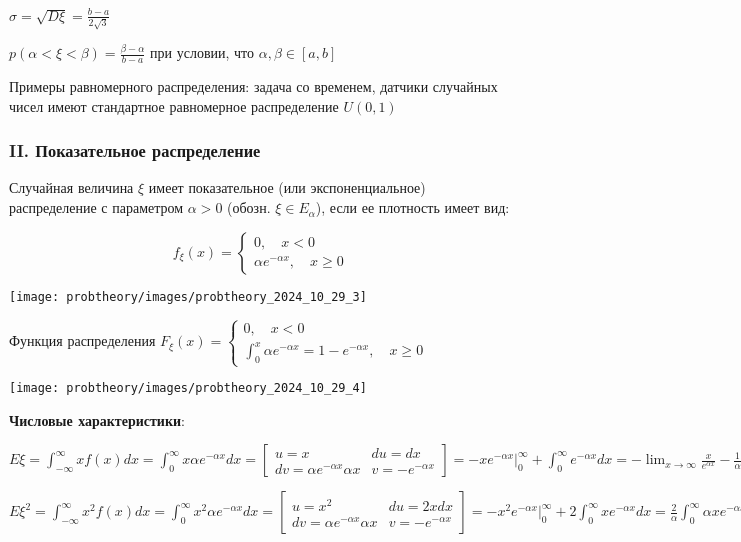 \documentclass[12pt]{article}
\begin{document}
    $\sigma = \sqrt{D\xi} = \frac{b - a}{2\sqrt{3}}$

    $p(\alpha < \xi < \beta) = \frac{\beta - \alpha}{b - a}$ при условии, что $\alpha, \beta \in [a, b]$

    \Nota Примеры равномерного распределения: задача со временем, датчики случайных чисел имеют стандартное равномерное распределение $U(0, 1)$

    \hypertarget{exponentialdistribution}{}

    \subsubsection{II. Показательное распределение}

    \Defs Случайная величина $\xi$ имеет показательное (или экспоненциальное) распределение с параметром $\alpha > 0$ (обозн. $\xi \in E_\alpha$),
    если ее плотность имеет вид:

    \[f_\xi(x) = \begin{cases}0, \quad x < 0 \\ \alpha e^{-\alpha x}, \quad x \geq 0\end{cases}\]

    \texttt{[image: probtheory/images/probtheory\_2024\_10\_29\_3]}

    Функция распределения $F_\xi(x) = \begin{cases}0, \quad x < 0 \\ \int_0^x \alpha e^{-\alpha x} = 1 - e^{-\alpha x}, \quad x \geq 0\end{cases}$

    \texttt{[image: probtheory/images/probtheory\_2024\_10\_29\_4]}

    \textbf{Числовые характеристики}:

    $E\xi = \int_{-\infty}^\infty x f(x) dx = \int_0^\infty x \alpha e^{-\alpha x} dx = \left[\begin{matrix}u = x & du = dx \\ dv = \alpha e^{-\alpha x} \alpha x & v = -e^{-\alpha x}\end{matrix}\right] = -xe^{-\alpha x} \Big|_0^\infty + \int_0^\infty e^{-\alpha x} dx = 
    -\lim_{x \to \infty} \frac{x}{e^{\alpha x}} - \frac{1}{\alpha} e^{-\alpha x} \Big|_0^\infty = -\lim_{x \to \infty} \frac{1}{\alpha e^{\alpha x}} - \frac{1}{\alpha} (\lim_{x \to \infty} e^{-\alpha x} - 1) = \frac{1}{\alpha}$


    $E\xi^2 = \int_{-\infty}^\infty x^2 f(x) dx = \int_0^\infty x^2 \alpha e^{-\alpha x} dx = \left[\begin{matrix}u = x^2 & du = 2xdx \\ dv = \alpha e^{-\alpha x} \alpha x & v = -e^{-\alpha x}\end{matrix}\right] = -x^2 e^{-\alpha x} \Big|_0^\infty + 2\int_0^\infty x e^{-\alpha x} dx = 
    \frac{2}{\alpha} \int_0^\infty \alpha x e^{-\alpha x} = \frac{2}{\alpha} E\xi = \frac{2}{\alpha^2}$
\end{document}
